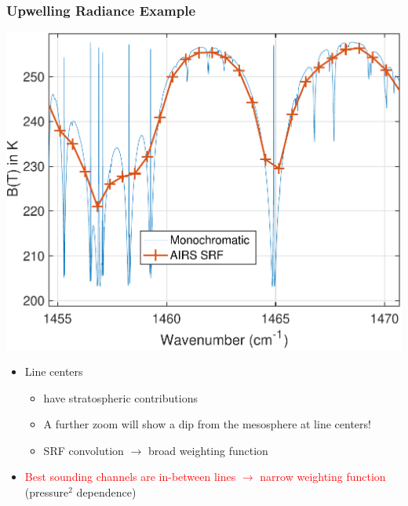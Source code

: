 \documentclass[10pt,t]{beamer}
\begin{document}
\begin{frame}
  \frametitle{Upwelling Radiance Example}
\vspace{-0.05in}
  \centering \includegraphics[width=0.625\linewidth]{Figslls/mono1460.pdf}
\vspace{-0.05in}
\begin{small}
\begin{itemize}
  \item Line centers 
     \begin{itemize}
        \item have stratospheric contributions \vspace{-0.03in}
        \item A further zoom will show a dip from the mesosphere at line centers!
        \item SRF convolution $\rightarrow$ broad weighting function
    \end{itemize}
  \item \textcolor{red}{Best sounding channels are in-between lines $\rightarrow$ narrow weighting function} (pressure$^2$ dependence)
  \end{itemize}
\end{small}
\end{frame}
\end{document}
